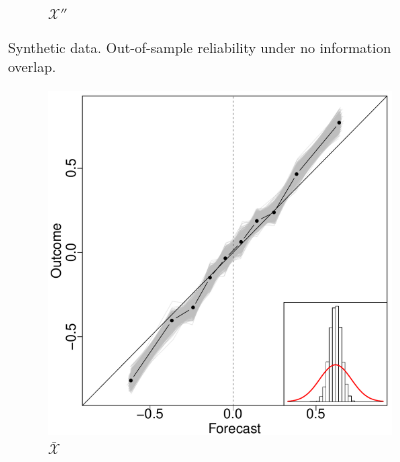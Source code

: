 \documentclass[11pt]{article}
\theoremstyle{definition}
\theoremstyle{definition}
\begin{document}
\begin{figure}[t!]
\begin{subfigure}[b]{0.241\textwidth}
                \caption{$\mathcal{X}''$ }
        \label{RevNoOverlap}
        \end{subfigure}
          \caption{Synthetic data. Out-of-sample reliability under no information overlap. }
        \label{NOVerlap}
\end{figure}


\begin{figure}[t!]
        \centering
        \begin{subfigure}[b]{0.241\textwidth}
                \includegraphics[width=\textwidth]{SimDepELP.pdf}
                \caption{$\bar{\mathcal{X}}$}
        \label{RelEWAHigh}
        \end{subfigure}%
        ~ %
        \begin{subfigure}[b]{0.241\textwidth}

\end{subfigure}
\end{figure}
\end{document}
